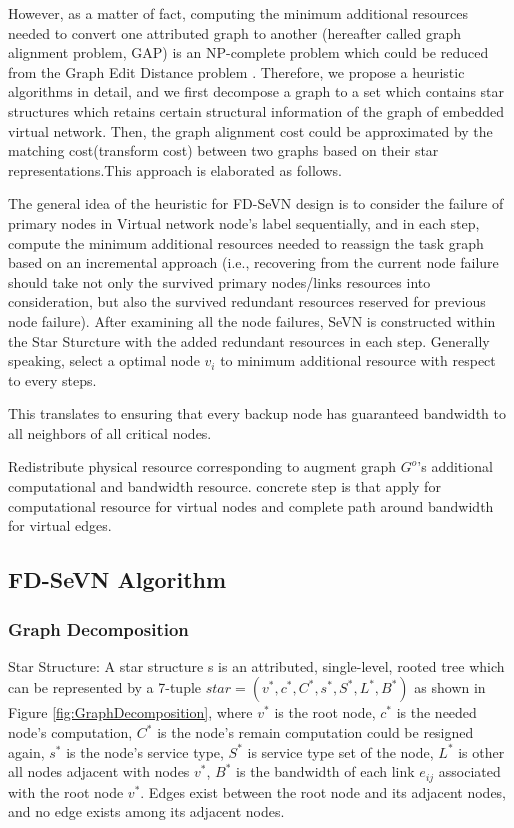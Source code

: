 However, as a matter of fact, computing the minimum additional resources needed to convert one attributed graph to another (hereafter called graph alignment problem, GAP) is an NP-complete problem which could be reduced from the Graph Edit Distance problem \cite{justice2006binary}. Therefore, we propose a heuristic algorithms in detail, and we first decompose a graph to a set which contains star structures which retains certain structural information of the graph of embedded virtual network. Then, the graph alignment cost could be approximated by the matching cost(transform cost) between two graphs based on their star representations.This approach is elaborated as follows.


The general idea of the heuristic for FD-SeVN design is to consider the failure of primary nodes in Virtual network node's label sequentially, and in each step, compute the minimum additional resources needed to reassign the task graph based on an incremental approach (i.e., recovering from the current node failure should take not only the survived primary nodes/links resources into consideration, but also the survived redundant resources reserved for previous node failure). After examining all the node failures, SeVN is constructed within the Star Sturcture with the added redundant resources in each step. Generally speaking, select a optimal node $v_i$ to minimum additional resource with respect to every steps.


This translates to ensuring that every backup node has guaranteed bandwidth to all neighbors of all critical nodes.

Redistribute physical resource corresponding to augment graph $G^o$'s additional computational and bandwidth resource. concrete step is that apply for computational resource for virtual nodes and complete path around bandwidth for virtual edges.

\subsection{FD-SeVN Algorithm}
\subsubsection{Graph Decomposition}
Star Structure: A star structure s is an attributed, single-level, rooted tree which can be represented by a 7-tuple $star=(v^*,c^*,C^*,s^*,S^*,L^*,B^*)$ as shown in Figure \ref{fig:GraphDecomposition}, where $v^*$ is the root node, $c^*$ is the needed node's computation, $C^*$ is the node's remain computation could be resigned again, $s^*$ is the node's service type, $S^*$ is service type set of the node, $L^*$ is other all nodes  adjacent with nodes $v^*$, $B^*$ is the bandwidth of each link $e_{ij}$ associated with the root node $v^*$. Edges exist between the root node and its adjacent nodes, and no edge exists among its adjacent nodes.

